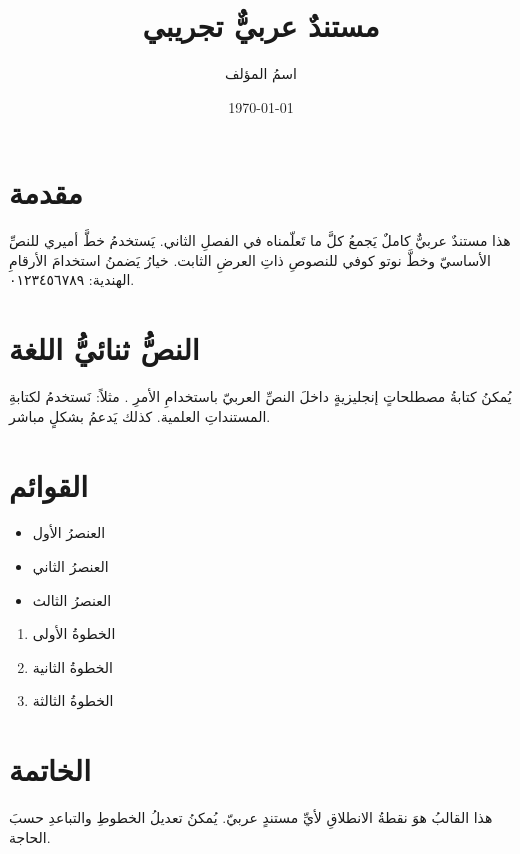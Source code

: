 \documentclass[12pt, a4paper]{article}
\begin{document}
\title{مستندٌ عربيٌّ تجريبي}
\author{اسمُ المؤلف}
\date{\today}
\maketitle

\section{مقدمة}

هذا مستندٌ عربيٌّ كاملٌ يَجمعُ كلَّ ما تَعلّمناه في الفصلِ الثاني. يَستخدمُ خطَّ أميري للنصِّ الأساسيّ وخطَّ نوتو كوفي للنصوصِ ذاتِ العرضِ الثابت. خيارُ  يَضمنُ استخدامَ الأرقامِ الهندية: ٠١٢٣٤٥٦٧٨٩.

\section{النصُّ ثنائيُّ اللغة}

يُمكنُ كتابةُ مصطلحاتٍ إنجليزيةٍ داخلَ النصِّ العربيّ باستخدامِ الأمرِ . مثلاً: نَستخدمُ  لكتابةِ المستنداتِ العلمية. كذلك  يَدعمُ  بشكلٍ مباشر.

\section{القوائم}

\begin{itemize}
  \item العنصرُ الأول
  \item العنصرُ الثاني
  \item العنصرُ الثالث
\end{itemize}

\begin{enumerate}
  \item الخطوةُ الأولى
  \item الخطوةُ الثانية
  \item الخطوةُ الثالثة
\end{enumerate}

\section{الخاتمة}

هذا القالبُ هوَ نقطةُ الانطلاقِ لأيِّ مستندٍ عربيّ. يُمكنُ تعديلُ الخطوطِ والتباعدِ حسبَ الحاجة.
\end{document}
